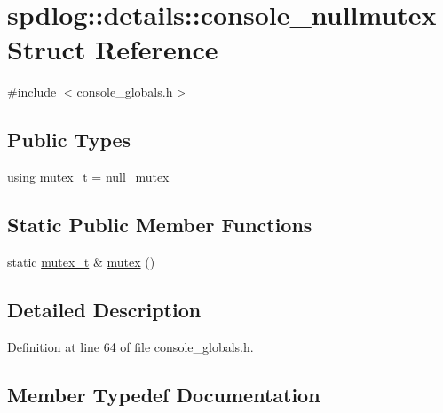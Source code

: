 \hypertarget{structspdlog_1_1details_1_1console__nullmutex}{}\section{spdlog\+:\+:details\+:\+:console\+\_\+nullmutex Struct Reference}
\label{structspdlog_1_1details_1_1console__nullmutex}


{\ttfamily \#include $<$console\+\_\+globals.\+h$>$}

\subsection*{Public Types}
\begin{DoxyCompactItemize}
\item 
using \hyperlink{structspdlog_1_1details_1_1console__nullmutex_a8464e2d02b3800061339841b94400da5}{mutex\+\_\+t} = \hyperlink{structspdlog_1_1details_1_1null__mutex}{null\+\_\+mutex}
\end{DoxyCompactItemize}
\subsection*{Static Public Member Functions}
\begin{DoxyCompactItemize}
\item 
static \hyperlink{structspdlog_1_1details_1_1console__nullmutex_a8464e2d02b3800061339841b94400da5}{mutex\+\_\+t} \& \hyperlink{structspdlog_1_1details_1_1console__nullmutex_a61016e82a5c02f104e04b58c53f8c95d}{mutex} ()
\end{DoxyCompactItemize}


\subsection{Detailed Description}


Definition at line 64 of file console\+\_\+globals.\+h.



\subsection{Member Typedef Documentation}
\mbox{\label{structspdlog_1_1details_1_1console__nullmutex_a8464e2d02b3800061339841b94400da5}} 
